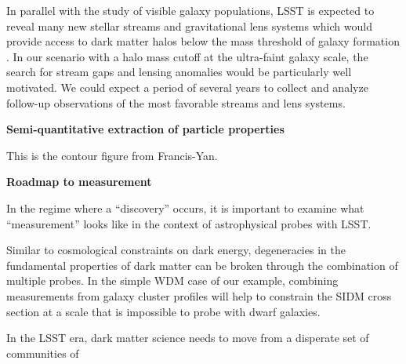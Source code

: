 \documentclass[modern,linenumbers]{aastex62}
\begin{document}
In parallel with the study of visible galaxy populations, LSST is expected to reveal many new stellar streams and gravitational lens systems which would provide access to dark matter halos below the mass threshold of galaxy formation .
In our scenario with a halo mass cutoff at the ultra-faint galaxy scale, the search for stream gaps and lensing anomalies would be particularly well motivated.
We could expect a period of several years to collect and analyze follow-up observations of the most favorable streams and lens systems.

{\bf Semi-quantitative extraction of particle properties}



This is the contour figure from Francis-Yan.

{\bf Roadmap to measurement}

In the regime where a ``discovery'' occurs, it is important to examine what ``measurement'' looks like in the context of astrophysical probes with LSST.


Similar to cosmological constraints on dark energy, degeneracies in the fundamental properties of dark matter can be broken through the combination of multiple probes.
In the simple WDM case of our example, combining measurements from galaxy cluster profiles will help to constrain the SIDM cross section at a scale that is impossible to probe with dwarf galaxies. 

In the LSST era, dark matter science needs to move from a disperate set of communities of 
\end{document}
